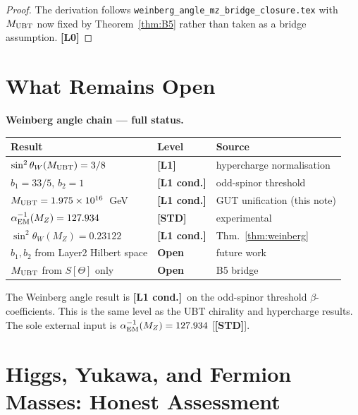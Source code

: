\documentclass[12pt,a4paper]{article}
\theoremstyle{remark}\newtheorem{remark}[theorem]{Remark}
\newcommand{\Lz}{\textbf{[L0]}}
\newcommand{\Lo}{\textbf{[L1]}}
\newcommand{\Lc}{\textbf{[L1 cond.]}}
\newcommand{\STD}{\textbf{[STD]}}
\begin{document}
\begin{proof}
The derivation follows \texttt{weinberg\_angle\_mz\_bridge\_closure.tex}
with $M_{\rm UBT}$ now fixed by Theorem~\ref{thm:B5}
rather than taken as a bridge assumption. \Lz
\end{proof}

\section{What Remains Open}
\label{sec:open}

\begin{statusbox}
\textbf{Weinberg angle chain — full status.}

\begin{center}
\renewcommand{\arraystretch}{1.25}\footnotesize
\begin{tabular}{p{5.5cm}p{2cm}p{4.5cm}}
\toprule
Result & Level & Source \\
\midrule
$\sin^2\theta_W(M_{\rm UBT})=3/8$ & \Lo & hypercharge normalisation \\
$b_1=33/5$, $b_2=1$ & \Lc & odd-spinor threshold \\
$M_{\rm UBT}=1.975\times10^{16}$~GeV & \Lc & GUT unification (this note) \\
$\alpha_{\rm EM}^{-1}(M_Z)=127.934$ & \STD & experimental \\
$\sin^2\theta_W(M_Z)=0.23122$ & \Lc & Thm.~\ref{thm:weinberg} \\
\midrule
$b_1,b_2$ from Layer2 Hilbert space & \textbf{Open} & future work \\
$M_{\rm UBT}$ from $S[\Theta]$ only & \textbf{Open} & B5 bridge \\
\bottomrule
\end{tabular}
\end{center}

\medskip
The Weinberg angle result is \Lc\ on the odd-spinor threshold
$\beta$-coefficients. This is the same level as the UBT chirality
and hypercharge results. The sole external input is
$\alpha_{\rm EM}^{-1}(M_Z)=127.934$ [\STD].
\end{statusbox}

\section{Higgs, Yukawa, and Fermion Masses: Honest Assessment}
\label{sec:higgs}
\end{document}

